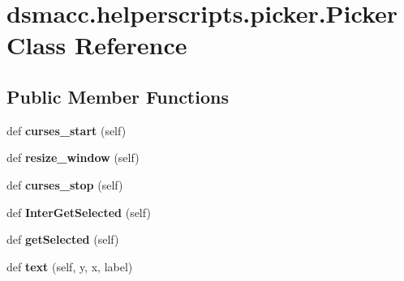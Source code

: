 \hypertarget{classdsmacc_1_1helperscripts_1_1picker_1_1Picker}{}\section{dsmacc.\+helperscripts.\+picker.\+Picker Class Reference}
\label{classdsmacc_1_1helperscripts_1_1picker_1_1Picker}
\subsection*{Public Member Functions}
\begin{DoxyCompactItemize}
\item 
\mbox{\label{classdsmacc_1_1helperscripts_1_1picker_1_1Picker_a219ba21aa1bba0b8395f2879b4a660ab}} 
def {\bfseries curses\+\_\+start} (self)
\item 
\mbox{\label{classdsmacc_1_1helperscripts_1_1picker_1_1Picker_aff36378754f8f3984e50806378e15f51}} 
def {\bfseries resize\+\_\+window} (self)
\item 
\mbox{\label{classdsmacc_1_1helperscripts_1_1picker_1_1Picker_a57de18f35ce1c68555e27644638a7cf1}} 
def {\bfseries curses\+\_\+stop} (self)
\item 
\mbox{\label{classdsmacc_1_1helperscripts_1_1picker_1_1Picker_a7e7751104ce992276de668d83ed6c3b7}} 
def {\bfseries Inter\+Get\+Selected} (self)
\item 
\mbox{\label{classdsmacc_1_1helperscripts_1_1picker_1_1Picker_ab7fd002b10ad761debfd8704644de65b}} 
def {\bfseries get\+Selected} (self)
\item 
\mbox{\label{classdsmacc_1_1helperscripts_1_1picker_1_1Picker_aa266ed5ab27286f2ac2e629d71c1f1d1}} 
def {\bfseries text} (self, y, x, label)
\item 
\mbox{\label{classdsmacc_1_1helperscripts_1_1picker_1_1Picker_a621d331303510d4a4c58b8f2334a9b34}} 

\end{DoxyCompactItemize}
